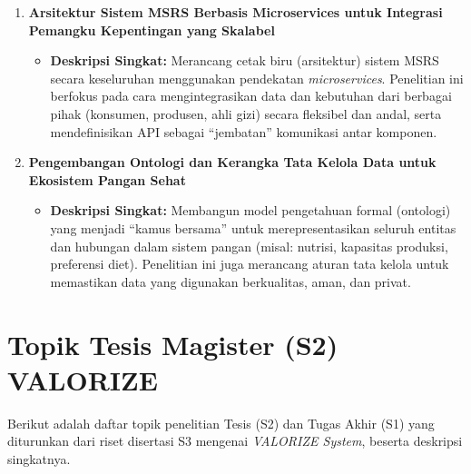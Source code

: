 \documentclass[
  letterpaper,
  DIV=11,
  numbers=noendperiod]{scrreprt}
\providecommand{\tightlist}{%
  \setlength{\itemsep}{0pt}\setlength{\parskip}{0pt}}
\begin{document}
\begin{enumerate}
\def\labelenumi{\arabic{enumi}.}
\tightlist
\item
  \textbf{Arsitektur Sistem MSRS Berbasis Microservices untuk Integrasi
  Pemangku Kepentingan yang Skalabel}

  \begin{itemize}
  \tightlist
  \item
    \textbf{Deskripsi Singkat:} Merancang cetak biru (arsitektur) sistem
    MSRS secara keseluruhan menggunakan pendekatan \emph{microservices}.
    Penelitian ini berfokus pada cara mengintegrasikan data dan
    kebutuhan dari berbagai pihak (konsumen, produsen, ahli gizi) secara
    fleksibel dan andal, serta mendefinisikan API sebagai ``jembatan''
    komunikasi antar komponen.
  \end{itemize}
\item
  \textbf{Pengembangan Ontologi dan Kerangka Tata Kelola Data untuk
  Ekosistem Pangan Sehat}

  \begin{itemize}
  \tightlist
  \item
    \textbf{Deskripsi Singkat:} Membangun model pengetahuan formal
    (ontologi) yang menjadi ``kamus bersama'' untuk merepresentasikan
    seluruh entitas dan hubungan dalam sistem pangan (misal: nutrisi,
    kapasitas produksi, preferensi diet). Penelitian ini juga merancang
    aturan tata kelola untuk memastikan data yang digunakan berkualitas,
    aman, dan privat.
  \end{itemize}
\end{enumerate}

\section{Topik Tesis Magister (S2)
VALORIZE}\label{topik-tesis-magister-s2-valorize}

Berikut adalah daftar topik penelitian Tesis (S2) dan Tugas Akhir (S1)
yang diturunkan dari riset disertasi S3 mengenai \emph{VALORIZE System},
beserta deskripsi singkatnya.
\end{document}
